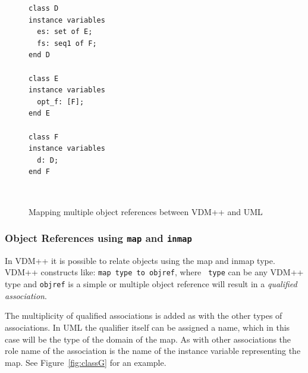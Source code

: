 \documentclass[\pformat,12pt]{article}
\newcommand{\vdmpp}{VDM++}
\begin{document}
\begin{figure}[htb]
\begin{center}
\hspace{-2cm}\begin{minipage}[t]{2in}
\begin{verbatim}
class D  
instance variables  
  es: set of E;  
  fs: seq1 of F;  
end D  
  
class E  
instance variables  
  opt_f: [F];  
end E  
  
class F  
instance variables  
  d: D;  
end F  
\end{verbatim}
\end{minipage} \ \
\begin{minipage}[t]{2in}
\vspace{1cm}
\end{minipage}
\caption{Mapping multiple object references between \vdmpp{} and UML\label{fig:classD}}
\end{center}
\end{figure}

\subsubsection*{Object References using {\tt map} and {\tt inmap}}
In \vdmpp{} it is possible to relate objects using the map and inmap
type. \vdmpp{} constructs like: {\tt map type to objref}, where {\tt
  type} can be any \vdmpp{} type and {\tt objref} is a simple or
multiple object reference will result in a {\it qualified
  association}.

The multiplicity of qualified   
associations is added as with the other types of associations. In UML the qualifier   
itself can be assigned a name, which in this case will be the type of the domain of the   
map. As with other associations the role name of the association is the name of the   
instance variable representing the map. See Figure~\ref{fig:classG} for an example. 
\end{document}
